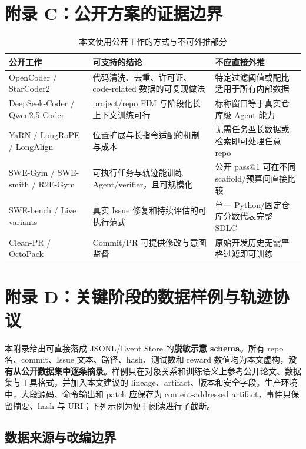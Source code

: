 \documentclass[10pt,a4paper,UTF8,fontset=none]{ctexart}
\begin{document}
\section{附录 C：公开方案的证据边界}

\begin{table}[htbp]
\centering
\caption{本文使用公开工作的方式与不可外推部分}
\label{tab:evidence-boundary}
\small
\begin{tabularx}{\textwidth}{p{3.0cm}YY}
\toprule
公开工作 & 可支持的结论 & 不应直接外推 \\
\midrule
OpenCoder / StarCoder2 & 代码清洗、去重、许可证、code-related 数据的可复现做法 & 特定过滤阈值或配比适用于所有内部数据 \\
DeepSeek-Coder / Qwen2.5-Coder & project/repo FIM 与阶段化长上下文训练可行 & 标称窗口等于真实仓库级 Agent 能力 \\
YaRN / LongRoPE / LongAlign & 位置扩展与长指令适配的机制与成本 & 无需任务型长数据或检索即可处理任意 repo \\
SWE-Gym / SWE-smith / R2E-Gym & 可执行任务与轨迹能训练 Agent/verifier，且可规模化 & 公开 pass@1 可在不同 scaffold/预算间直接比较 \\
SWE-bench / Live variants & 真实 Issue 修复和持续评估的可执行范式 & 单一 Python/固定仓库分数代表完整 SDLC \\
Clean-PR / OctoPack & Commit/PR 可提供修改与意图监督 & 原始开发历史无需严格过滤即可训练 \\
\bottomrule
\end{tabularx}
\end{table}

\section{附录 D：关键阶段的数据样例与轨迹协议}

本附录给出可直接落成 JSONL/Event Store 的\textbf{脱敏示意 schema}。所有 repo 名、commit、Issue 文本、路径、hash、测试数和 reward 数值均为本文虚构，\textbf{没有从公开数据集中逐条摘录}。样例只在对象关系和训练语义上参考公开论文、数据集与工具格式，并加入本文建议的 lineage、artifact、版本和安全字段。生产环境中，大段源码、命令输出和 patch 应保存为 content-addressed artifact，事件只保留摘要、hash 与 URI；下列示例为便于阅读进行了截断。

\subsection{数据来源与改编边界}
\end{document}
